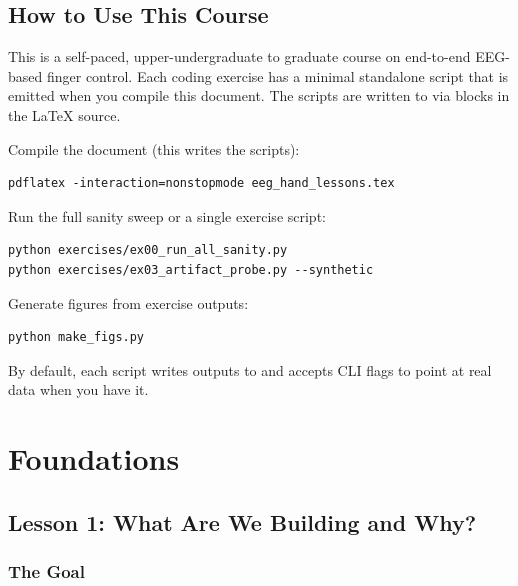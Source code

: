 \documentclass[11pt,openany]{book}
\begin{document}
\maketitle
\tableofcontents
\clearpage

\chapter*{How to Use This Course}

This is a self-paced, upper-undergraduate to graduate course on end-to-end
EEG-based finger control. Each coding exercise has a minimal standalone script
that is emitted when you compile this document. The scripts are written to
\texttt{} via \texttt{} blocks in the LaTeX source.

Compile the document (this writes the scripts):
\begin{lstlisting}
pdflatex -interaction=nonstopmode eeg_hand_lessons.tex
\end{lstlisting}

Run the full sanity sweep or a single exercise script:
\begin{lstlisting}
python exercises/ex00_run_all_sanity.py
python exercises/ex03_artifact_probe.py --synthetic
\end{lstlisting}

Generate figures from exercise outputs:
\begin{lstlisting}
python make_figs.py
\end{lstlisting}

By default, each script writes outputs to \texttt{} and accepts
CLI flags to point at real data when you have it.

\part{Foundations}

\chapter{Lesson 1: What Are We Building and Why?}

\section{The Goal}
\end{document}
